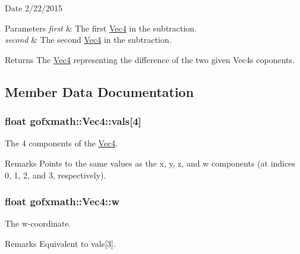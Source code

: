 \begin{DoxyDate}{Date}
2/22/2015
\end{DoxyDate}

\begin{DoxyParams}{Parameters}
{\em first} & The first \hyperlink{classgofxmath_1_1_vec4}{Vec4} in the subtraction. \\
\hline
{\em second} & The second \hyperlink{classgofxmath_1_1_vec4}{Vec4} in the subtraction.\\
\hline
\end{DoxyParams}
\begin{DoxyReturn}{Returns}
The \hyperlink{classgofxmath_1_1_vec4}{Vec4} representing the difference of the two given Vec4s\textquotesingle{} coponents. 
\end{DoxyReturn}


\subsection{Member Data Documentation}
\hypertarget{classgofxmath_1_1_vec4_a72f1c74b748d6fda1d8add90f51dc691}{}
\subsubsection[{vals}]{\setlength{\rightskip}{0pt plus 5cm}float gofxmath\+::\+Vec4\+::vals\mbox{[}4\mbox{]}}\label{classgofxmath_1_1_vec4_a72f1c74b748d6fda1d8add90f51dc691}


The 4 components of the \hyperlink{classgofxmath_1_1_vec4}{Vec4}. 

\begin{DoxyRemark}{Remarks}
Points to the same values as the x, y, z, and w components (at indices 0, 1, 2, and 3, respectively). 
\end{DoxyRemark}
\hypertarget{classgofxmath_1_1_vec4_aeda815ed6e7a8febdffcdfa6cc8a2d04}{}
\subsubsection[{w}]{\setlength{\rightskip}{0pt plus 5cm}float gofxmath\+::\+Vec4\+::w}\label{classgofxmath_1_1_vec4_aeda815ed6e7a8febdffcdfa6cc8a2d04}


The w-\/coordinate. 

\begin{DoxyRemark}{Remarks}
Equivalent to vals\mbox{[}3\mbox{]}. 
\end{DoxyRemark}
\hypertarget{classgofxmath_1_1_vec4_a5de27b4df2e699a1b30ec3a51258f208}{}
